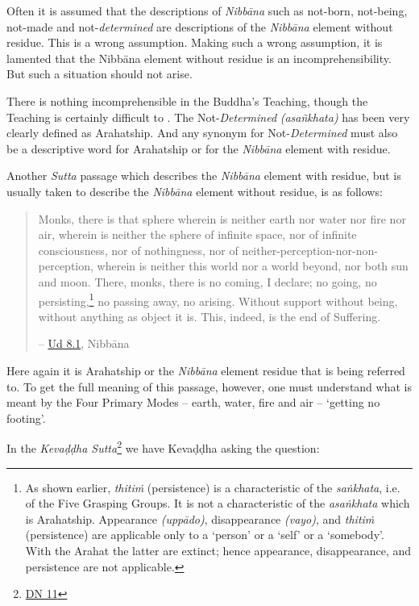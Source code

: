 Often it is assumed that the descriptions of \emph{Nibbāna} such as not-born, not-being, not-made and not-\emph{determined} are descriptions of the \emph{Nibbāna} element without residue. This is a wrong assumption. Making such a wrong assumption, it is lamented that the Nibbāna element without residue is an incomprehensibility. But such a situation should not arise.

There is nothing incomprehensible in the Buddha's Teaching, though the Teaching is certainly difficult to . The Not-\emph{Determined} \emph{(asañkhata)} has been very clearly defined as Arahatship. And any synonym for Not-\emph{Determined} must also be a descriptive word for Arahatship or for the \emph{Nibbāna} element with residue.

Another \emph{Sutta} passage which describes the \emph{Nibbāna} element with residue, but is usually taken to describe the \emph{Nibbāna} element without residue, is as follows:

\begin{quote}
Monks, there is that sphere wherein is neither earth nor water nor fire nor air, wherein is neither the sphere of infinite space, nor of infinite consciousness, nor of nothingness, nor of neither-perception-nor-non-perception, wherein is neither this world nor a world beyond, nor both sun and moon. There, monks, there is no coming, I declare; no going, no persisting,\footnote{As shown earlier, \emph{thitiṁ} (persistence) is a characteristic of the \emph{saṅkhata}, i.e. of the Five Grasping Groups. It is not a characteristic of the \emph{asaṅkhata} which is Arahatship. Appearance \emph{(uppādo)}, disappearance \emph{(vayo)}, and \emph{thitiṁ} (persistence) are applicable only to a `person' or a `self' or a `somebody'. With the Arahat the latter are extinct; hence appearance, disappearance, and persistence are not applicable.} no passing away, no arising. Without support without being, without anything as object it is. This, indeed, is the end of Suffering.

 -- \href{https://suttacentral.net/ud8.1/en/anandajoti}{Ud 8.1}, Nibbāna
\end{quote}

Here again it is Arahatship or the \emph{Nibbāna} element  residue that is being referred to. To get the full meaning of this passage, however, one must understand what is meant by the Four Primary Modes -- earth, water, fire and air -- `getting no footing'.

In the \emph{Kevaḍḍha Sutta}\footnote{\href{https://suttacentral.net/dn11/en/sujato}{DN 11}} we have Kevaḍḍha asking the question:

